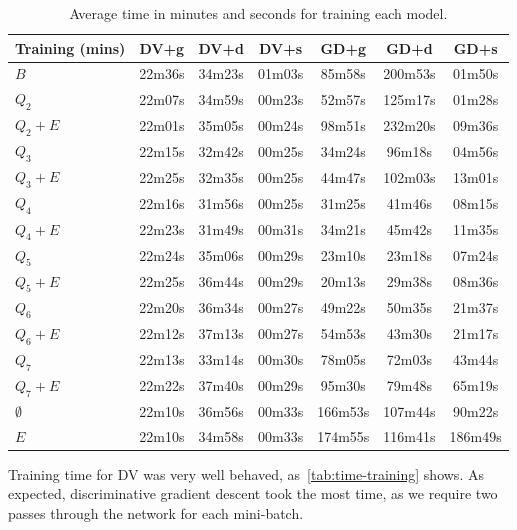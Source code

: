 \begin{table}[h]
  \centering
  \begin{tabular}{l|c|c|c|c|c|c}
    \hline
    \multicolumn{1}{c}{\bfseries Training (mins)} & \multicolumn{1}{c}{\bfseries DV+g} &
    \multicolumn{1}{c}{\bfseries DV+d} & \multicolumn{1}{c}{\bfseries DV+s} &
    \multicolumn{1}{c}{\bfseries GD+g} & \multicolumn{1}{c}{\bfseries GD+d} &
    \multicolumn{1}{c}{\bfseries GD+s}\\
    \hline
    $B$         & 22m36s & 34m23s & 01m03s & 85m58s & 200m53s& 01m50s \\
    $Q_2$       & 22m07s & 34m59s & 00m23s & 52m57s & 125m17s& 01m28s \\
    $Q_2+E$     & 22m01s & 35m05s & 00m24s & 98m51s & 232m20s& 09m36s \\
    $Q_3$       & 22m15s & 32m42s & 00m25s & 34m24s & 96m18s & 04m56s \\
    $Q_3+E$     & 22m25s & 32m35s & 00m25s & 44m47s & 102m03s& 13m01s \\
    $Q_4$       & 22m16s & 31m56s & 00m25s & 31m25s & 41m46s & 08m15s \\
    $Q_4+E$     & 22m23s & 31m49s & 00m31s & 34m21s & 45m42s & 11m35s \\
    $Q_5$       & 22m24s & 35m06s & 00m29s & 23m10s & 23m18s & 07m24s \\
    $Q_5+E$     & 22m25s & 36m44s & 00m29s & 20m13s & 29m38s & 08m36s \\
    $Q_6$       & 22m20s & 36m34s & 00m27s & 49m22s & 50m35s & 21m37s \\
    $Q_6+E$     & 22m12s & 37m13s & 00m27s & 54m53s & 43m30s & 21m17s \\
    $Q_7$       & 22m13s & 33m14s & 00m30s & 78m05s & 72m03s & 43m44s \\
    $Q_7+E$     & 22m22s & 37m40s & 00m29s & 95m30s & 79m48s & 65m19s \\
    $\emptyset$ & 22m10s & 36m56s & 00m33s &166m53s & 107m44s& 90m22s \\
    $E$         & 22m10s & 34m58s & 00m33s &174m55s & 116m41s& 186m49s\\
  \end{tabular}
  \caption{Average time in minutes and seconds for training each model.\label{tab:time-training}}
\end{table}

Training time for DV was very well behaved, as~\autoref{tab:time-training} shows. As expected,
discriminative gradient descent took the most time, as we require two passes through the network
for each mini-batch.


